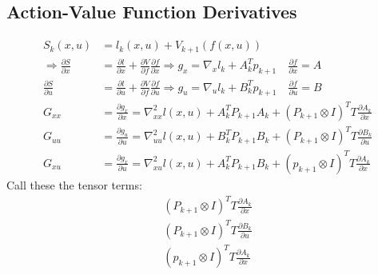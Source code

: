 \documentclass[11pt]{article}
\begin{document}
\subsection{Action-Value Function Derivatives}
\begin{align*}
    S_k(x,u) &= l_k(x,u) + V_{k+1}(f(x,u))
    \\
    \Rightarrow \frac{\partial S}{\partial x} &= \frac{\partial l}{\partial x} + \frac{\partial V}{\partial f}\frac{\partial f}{\partial x} \Rightarrow \boxed{g_x = \nabla_x l_k + A_k^T p_{k+1}} \quad \frac{\partial f}{\partial x} = A 
    \\
    \frac{\partial S}{\partial u} &= \frac{\partial l}{\partial u} + \frac{\partial V}{\partial f}\frac{\partial f}{\partial u} \Rightarrow \boxed{g_u = \nabla_u l_k + B_k^Tp_{k+1}} \quad \frac{\partial f}{\partial u} = B
    \\
    G_{xx} &= \frac{\partial g_x}{\partial x} = \nabla_{xx}^2 l(x,u) + A_k^TP_{k+1} A_k + (P_{k+1}\otimes I)^TT\frac{\partial A_k}{\partial x}
    \\
    G_{uu} &= \frac{\partial g_u}{\partial u} = \nabla_{uu}^2l(x,u) + B_k^T P_{k+1}B_k + (P_{k+1}\otimes I)^TT\frac{\partial B_k}{\partial u}
    \\
    G_{xu} &= \frac{\partial g_x}{\partial u} = \nabla_{xu}^2 l(x,u) + A_k^TP_{k+1}B_k + (p_{k+1} \otimes I)^TT\frac{\partial A_k}{\partial x}
\end{align*}
Call these the tensor terms:
\begin{align*}
    (P_{k+1}\otimes I)^TT\frac{\partial A_k}{\partial x}
    \\
    (P_{k+1}\otimes I)^TT\frac{\partial B_k}{\partial u} 
    \\
    (p_{k+1} \otimes I)^TT\frac{\partial A_k}{\partial x}
\end{align*}
\end{document}
